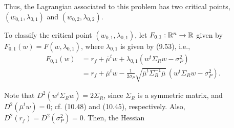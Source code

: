 Thus, the Lagrangian associated to this problem has two critical points,
$(w_{0,1},\lambda_{0,1})$ and $(w_{0,2},\lambda_{0,2})$.

To classify the critical point $(w_{0,1},\lambda_{0,1})$, let $F_{0,1}:\mathbb{R}^n\to\mathbb{R}$
given by $F_{0,1}(w)=F(w,\lambda_{0,1})$, where $\lambda_{0,1}$ is given by (9.53),
i.e.,
\begin{align*}
F_{0,1}(w) &= r_f+\bar\mu^tw+\lambda_{0,1}(w^t\Sigma_Rw-\sigma_P^2) \\
&= r_f+\bar\mu^tw-\frac{1}{2\sigma_P}\sqrt{\bar\mu^t\Sigma_R^{-1}\bar\mu}\,
(w^t\Sigma_Rw-\sigma_P^2).
\end{align*}

Note that $D^2(w^t\Sigma_Rw)=2\Sigma_R$, since $\Sigma_R$ is a symmetric matrix, and
$D^2(\bar\mu^tw)=0$; cf. (10.48) and (10.45), respectively. Also, $D^2(r_f) =
D^2(\sigma_P^2) = 0$. Then, the Hessian
